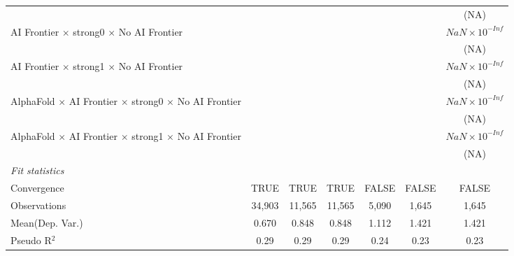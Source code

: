 \begin{tabular}{lcccccc}
                                                                              &               &               &               &                        &                        & (NA)\\   
   AI Frontier $\times$ strong0 $\times$ No AI Frontier                       &               &               &               &                        &                        & $NaN\times 10^{-Inf}$\\    
                                                                              &               &               &               &                        &                        & (NA)\\   
   AI Frontier $\times$ strong1 $\times$ No AI Frontier                       &               &               &               &                        &                        & $NaN\times 10^{-Inf}$\\    
                                                                              &               &               &               &                        &                        & (NA)\\   
   AlphaFold $\times$ AI Frontier $\times$ strong0 $\times$ No AI Frontier    &               &               &               &                        &                        & $NaN\times 10^{-Inf}$\\    
                                                                              &               &               &               &                        &                        & (NA)\\   
   AlphaFold $\times$ AI Frontier $\times$ strong1 $\times$ No AI Frontier    &               &               &               &                        &                        & $NaN\times 10^{-Inf}$\\    
                                                                              &               &               &               &                        &                        & (NA)\\   
   \midrule
   \emph{Fit statistics}\\
   Convergence                                                                &TRUE           & TRUE          & TRUE          & FALSE                  & FALSE                  & FALSE\\  
   Observations                                                               & 34,903        & 11,565        & 11,565        & 5,090                  & 1,645                  & 1,645\\  
Mean(Dep. Var.) & 0.670 & 0.848 & 0.848 & 1.112 & 1.421 & 1.421 \\
   Pseudo R$^2$                                                               & 0.29          & 0.29          & 0.29          & 0.24                   & 0.23                   & 0.23\\  
   

\end{tabular}
